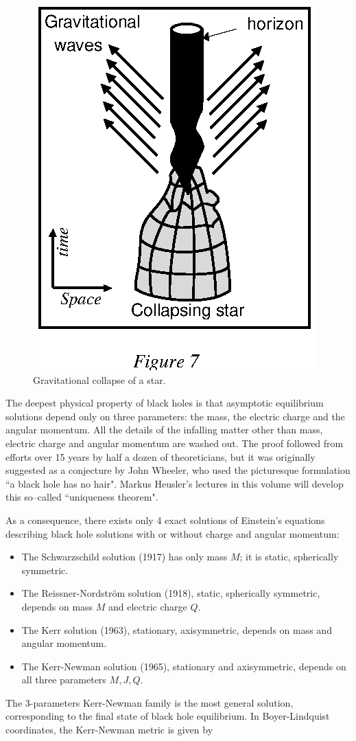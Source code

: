 \documentclass[12pt]{article}
\begin{document}
\begin{figure}[tb]
  \begin{center}
    \leavevmode
    \includegraphics{coll.ps}       
    \caption{Gravitational collapse of a star.}
  \end{center}
\end{figure}
The deepest physical property of black holes is that asymptotic
equilibrium solutions depend only on three parameters:
the mass, the electric charge and the angular momentum. All the
details of the infalling matter other than mass, electric charge and 
angular momentum are washed out. The proof followed from efforts
over 15 years by half a dozen of theoreticians, but it was originally suggested as
a conjecture by John Wheeler, who used the picturesque formulation ``a black
hole has no hair".
Markus Heusler's lectures in this volume will develop this so--called
``uniqueness theorem".  

As a consequence, there exists only 4 exact solutions of Einstein's equations
describing black hole solutions with or without charge and angular momentum:

 \begin{itemize}  
\item The Schwarzschild solution (1917) has only mass $M$; it is static,
spherically symmetric.
  \item  The Reissner-Nordstr\"om solution (1918),
static, spherically symmetric, depends on mass $M$ and electric charge $Q$. 
\item The Kerr solution (1963), stationary, axisymmetric,  depends on mass and
angular momentum.
\item The Kerr-Newman solution (1965),  stationary and axisymmetric, depends on
all three parameters $M, J, Q$. 
\end{itemize}
The 3-parameters Kerr-Newman family is the most general solution,
corresponding to the final state of black hole equilibrium. In
Boyer-Lindquist coordinates, the Kerr-Newman metric is given
by
\end{document}
